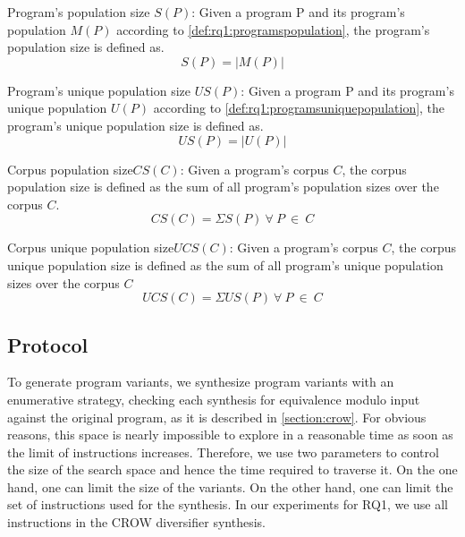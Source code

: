 \begin{metric}{Program's population size $S(P)$:}\label{metric:rq1:PS}
    \normalfont 
    Given a program P and its program's population $M(P)$ according to \autoref{def:rq1:programspopulation}, the program's population size is defined as.\\
    $$
        S(P)=|M(P)|
    $$
\end{metric}


\begin{metric}{Program's unique population size $US(P)$:}\label{metric:rq1:UP}
    \normalfont 
    Given a program P and its program's unique population $U(P)$ according to \autoref{def:rq1:programsuniquepopulation}, the program's unique population size is defined as.\\
    $$
        US(P)=|U(P)|
    $$
\end{metric}

\newcommand{\corpuspopulationsizename}{Corpus population size\xspace}
\newcommand{\corpusuniquepopulationsizename}{Corpus unique population size\xspace}

\begin{metric}{\corpuspopulationsizename$CS(C)$:}\label{metric:rq1:corpus_pop}
    \normalfont 
    Given a program's corpus $C$, the corpus population size is defined as the sum of all program's population sizes over the corpus $C$.\\
    $$
        CS(C)=\Sigma{S(P)}\ \forall\ P\ \in\ C
    $$
\end{metric}

\begin{metric}{\corpusuniquepopulationsizename$UCS(C)$:}\label{metric:rq1:corpus_pop_unique}
    \normalfont 
    Given a program's corpus $C$, the corpus unique population size is defined as the sum of all program's unique population sizes over the corpus $C$\\
    $$
    UCS(C)=\Sigma{US(P)}\ \forall\ P\ \in\ C
    $$
\end{metric}


\subsection*{Protocol}
To generate program variants, we synthesize program variants with an enumerative strategy, checking each synthesis for equivalence modulo input \cite{Li2018} against the original program, as it is described in \autoref{section:crow}. For obvious reasons, this space is nearly impossible to explore in a reasonable time as soon as the limit of instructions increases.
Therefore, we use two parameters to control the size of the search space and hence the time required to traverse it.
On the one hand, one can limit the size of the variants. On the other hand, one can limit the set of instructions used for the synthesis. In our experiments for RQ1, we use all instructions in the CROW diversifier synthesis.


